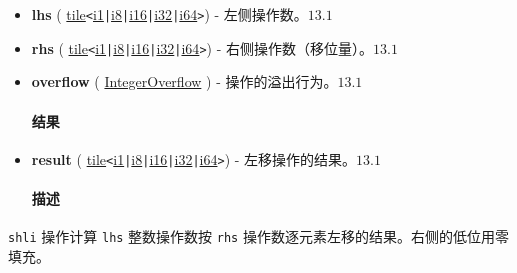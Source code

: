 \documentclass{article}
\begin{document}
\begin{itemize}
\item \textbf{lhs} ( \href{https://docs.nvidia.com/cuda/tile-ir/latest/sections/types.html#type-tile}{tile}\texttt{<}\href{https://docs.nvidia.com/cuda/tile-ir/latest/sections/types.html#subsection-element-types}{i1}\texttt{|}\href{https://docs.nvidia.com/cuda/tile-ir/latest/sections/types.html#subsection-element-types}{i8}\texttt{|}\href{https://docs.nvidia.com/cuda/tile-ir/latest/sections/types.html#subsection-element-types}{i16}\texttt{|}\href{https://docs.nvidia.com/cuda/tile-ir/latest/sections/types.html#subsection-element-types}{i32}\texttt{|}\href{https://docs.nvidia.com/cuda/tile-ir/latest/sections/types.html#subsection-element-types}{i64}\texttt{>}) - 左侧操作数。$\boxed{13.1}$
\item \textbf{rhs} ( \href{https://docs.nvidia.com/cuda/tile-ir/latest/sections/types.html#type-tile}{tile}\texttt{<}\href{https://docs.nvidia.com/cuda/tile-ir/latest/sections/types.html#subsection-element-types}{i1}\texttt{|}\href{https://docs.nvidia.com/cuda/tile-ir/latest/sections/types.html#subsection-element-types}{i8}\texttt{|}\href{https://docs.nvidia.com/cuda/tile-ir/latest/sections/types.html#subsection-element-types}{i16}\texttt{|}\href{https://docs.nvidia.com/cuda/tile-ir/latest/sections/types.html#subsection-element-types}{i32}\texttt{|}\href{https://docs.nvidia.com/cuda/tile-ir/latest/sections/types.html#subsection-element-types}{i64}\texttt{>}) - 右侧操作数（移位量）。$\boxed{13.1}$
\item \textbf{overflow} ( \href{https://docs.nvidia.com/cuda/tile-ir/latest/sections/operations.html#op-attribute-cuda-tile-shli-integeroverflow-attr}{IntegerOverflow} ) - 操作的溢出行为。$\boxed{13.1}$




\paragraph{结果}


\item \textbf{result} ( \href{https://docs.nvidia.com/cuda/tile-ir/latest/sections/types.html#type-tile}{tile}\texttt{<}\href{https://docs.nvidia.com/cuda/tile-ir/latest/sections/types.html#subsection-element-types}{i1}\texttt{|}\href{https://docs.nvidia.com/cuda/tile-ir/latest/sections/types.html#subsection-element-types}{i8}\texttt{|}\href{https://docs.nvidia.com/cuda/tile-ir/latest/sections/types.html#subsection-element-types}{i16}\texttt{|}\href{https://docs.nvidia.com/cuda/tile-ir/latest/sections/types.html#subsection-element-types}{i32}\texttt{|}\href{https://docs.nvidia.com/cuda/tile-ir/latest/sections/types.html#subsection-element-types}{i64}\texttt{>}) - 左移操作的结果。$\boxed{13.1}$




\paragraph{描述}


\end{itemize}
\texttt{shli} 操作计算 \texttt{lhs} 整数操作数按 \texttt{rhs} 操作数逐元素左移的结果。右侧的低位用零填充。
\end{document}
